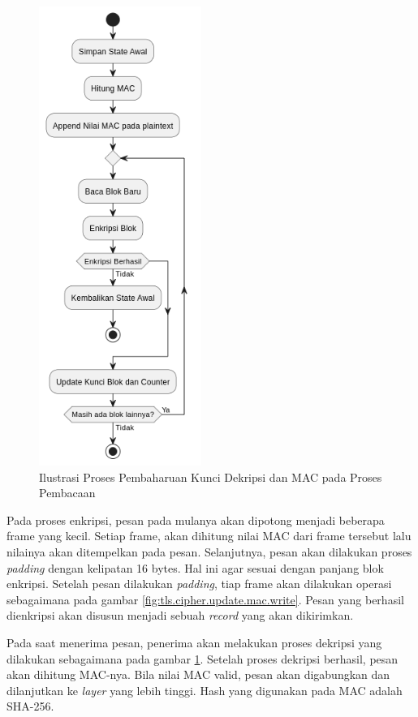 \begin{figure}[!h]
  \centering
  \includegraphics[width=200px]{chapters/res/chapter-3/img/update.read.png}
  \caption{Ilustrasi Proses Pembaharuan Kunci Dekripsi dan MAC pada Proses Pembacaan} \label{fig:tls.cipher.update.mac.read}
\end{figure}

Pada proses enkripsi, pesan pada mulanya akan dipotong menjadi beberapa frame yang kecil. Setiap frame, akan dihitung nilai MAC dari frame tersebut lalu nilainya akan ditempelkan pada pesan. Selanjutnya, pesan akan dilakukan proses \emph{padding} dengan kelipatan 16 bytes. Hal ini agar sesuai dengan panjang blok enkripsi. Setelah pesan dilakukan \emph{padding}, tiap frame akan dilakukan operasi sebagaimana pada gambar \ref{fig:tls.cipher.update.mac.write}. Pesan yang berhasil dienkripsi akan disusun menjadi sebuah \emph{record} yang akan dikirimkan.

Pada saat menerima pesan, penerima akan melakukan proses dekripsi yang dilakukan sebagaimana pada gambar \ref{fig:tls.cipher.update.mac.read}. Setelah proses dekripsi berhasil, pesan akan dihitung MAC-nya. Bila nilai MAC valid, pesan akan digabungkan dan dilanjutkan ke \emph{layer} yang lebih tinggi. Hash yang digunakan pada MAC adalah SHA-256.


